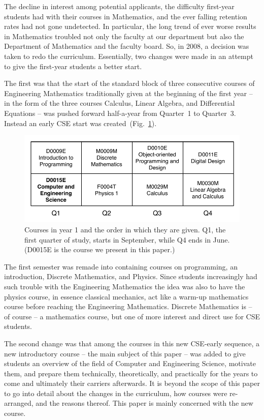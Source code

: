 \documentclass[conference]{IEEEtran}
\begin{document}
The decline in interest among potential applicants, the difficulty first-year students had with their courses in Mathematics, and the ever falling retention rates had not gone undetected. In particular, the long trend of ever worse results in  Mathematics troubled not only the faculty at our department but also the Department of Mathematics and the faculty board. So, in 2008, a decision was taken to redo the curriculum. 
Essentially, two changes were made in an attempt to give the first-year students a better start.

The first was that the start of the standard block of three consecutive courses of Engineering Mathematics traditionally given at the beginning of the first year -- in the form of the three courses Calculus, Linear Algebra, and Differential Equations -- was pushed forward half-a-year from Quarter~1 to Quarter~3. Instead an early CSE start was created~(Fig.~\ref{fig:year-one}). 
\begin{figure}[!t]
  \centering
  \includegraphics[width=\columnwidth]{year-one}
  \caption{Courses in year 1 and the order in which they are given. Q1, the first quarter 
                of study, starts in September, while Q4 ends in June. (D0015E is the course we 
                present in this paper.)}
  \label{fig:year-one}
\end{figure} 
The first semester was remade into containing courses on programming, an introduction, Discrete Mathematics, and Physics. 
Since students increasingly had such trouble with the Engineering Mathematics the idea was also to have the physics course, in essence classical mechanics, act like a warm-up mathematics course before reaching the Engineering Mathematics. Discrete Mathematics is – of course – a mathematics course, but one of more interest and direct use for CSE students.

The second change was that among the courses in this new CSE-early sequence, a new introductory course -- the main subject of this paper -- was added to give students an overview of the field of Computer and Engineering Science, motivate them, and prepare them technically, theoretically, and practically for the years to come and ultimately their carriers afterwards. 
It is beyond the scope of this paper to go into detail about the changes in the curriculum, how courses were re-arranged, and the reasons thereof. This paper is mainly concerned with the new course. 
\end{document}
